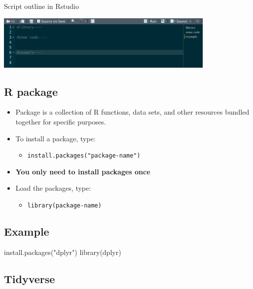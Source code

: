 \documentclass[
  letterpaper,
  DIV=11,
  numbers=noendperiod,
  oneside]{scrartcl}
\newenvironment{Shaded}{\begin{snugshade}}{\end{snugshade}}
\newcommand{\FunctionTok}[1]{\textcolor[rgb]{0.28,0.35,0.67}{#1}}
\newcommand{\NormalTok}[1]{\textcolor[rgb]{0.00,0.23,0.31}{#1}}
\newcommand{\StringTok}[1]{\textcolor[rgb]{0.13,0.47,0.30}{#1}}
\providecommand{\tightlist}{%
  \setlength{\itemsep}{0pt}\setlength{\parskip}{0pt}}\usepackage{longtable,booktabs,array}
\begin{document}
Script outline in Rstudio

\includegraphics[width=0.8\textwidth,height=\textheight]{Intro_R_files/mediabag/4yjqd.png}

\subsection{R package}\label{r-package}

\begin{itemize}
\item
  Package is a collection of R functions, data sets, and other resources
  bundled together for specific purposes.
\item
  To install a package, type:

  \begin{itemize}
  \tightlist
  \item
    \texttt{install.packages("package-name")}
  \end{itemize}
\item
  \textbf{You only need to install packages once}
\item
  Load the packages, type:

  \begin{itemize}
  \tightlist
  \item
    \texttt{library(package-name)}
  \end{itemize}
\end{itemize}

\subsection{Example}\label{example}

\begin{Shaded}
\begin{Highlighting}[]
\FunctionTok{install.packages}\NormalTok{(}\StringTok{"dplyr"}\NormalTok{)}
\FunctionTok{library}\NormalTok{(dplyr)}
\end{Highlighting}
\end{Shaded}

\subsection{Tidyverse}\label{tidyverse}
\end{document}
